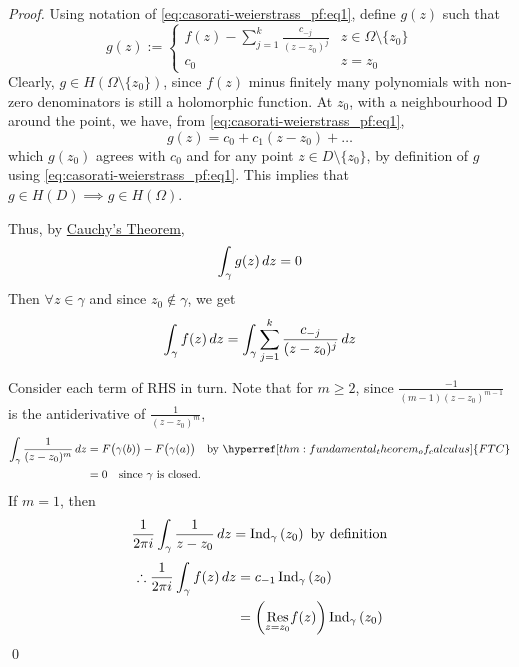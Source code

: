 \documentclass[notoc,notitlepage]{tufte-book}
\begin{document}
\begin{proof}
  Using notation of \cref{eq:casorati-weierstrass_pf:eq1}, define $g(z)$ such that
  \begin{equation*}
    g(z) := \begin{cases}
      f(z) - \sum_{j = 1}^{k} \frac{c_{-j}}{(z - z_0)^j}  & z \in \Omega \setminus \{z_0\} \\
      c_0                                                 & z = z_0
    \end{cases}
  \end{equation*}
  Clearly, $g \in H(\Omega \setminus \{z_0\})$, since $f(z)$ minus finitely many polynomials with non-zero denominators is still a holomorphic function. At $z_0$, with a neighbourhood D around the point, we have, from \cref{eq:casorati-weierstrass_pf:eq1},
  \begin{equation*}
    g(z) = c_0 + c_1 (z - z_0) + \hdots
  \end{equation*}
  which $g(z_0)$ agrees with $c_0$ and for any point $z \in D \setminus \{z_0\}$, by definition of $g$ using \cref{eq:casorati-weierstrass_pf:eq1}. This implies that $g \in H(D) \implies g \in H(\Omega)$.

  Thus, by \hyperref[thm:cauchy_s_theorem_for_convex_set]{Cauchy's Theorem},
  \begin{equation*}
    \int_{\gamma} g(z) \dif{z} = 0
  \end{equation*}
  Then $\forall z \in \gamma$ and since $z_0 \not\in \gamma$, we get
  \begin{equation*}
    \int_{\gamma} f(z) \dif{z} = \int_{\gamma} \sum_{j = 1}^k \frac{c_{-j}}{(z - z_0)^j} \dif{z}
  \end{equation*}

  Consider each term of RHS in turn. Note that for $m \geq 2$, since $\frac{-1}{(m - 1)(z - z_0)^{m - 1}}$ is the antiderivative of $\frac{1}{(z - z_0)^m}$,
  \begin{align*}
    \int_{\gamma} \frac{1}{(z - z_0)^m} \dif{z}
      &= F\big( \gamma(b) \big) - F\big( \gamma(a) \big) \quad \text{by } \hyperref[thm:fundamental_theorem_of_calculus]{FTC} \\
      &= 0 \quad \text{since } \gamma \text{ is closed.}
  \end{align*}
  If $m = 1$, then
  \begin{equation*}
    \frac{1}{2 \pi i} \int_{\gamma} \frac{1}{z - z_0} \dif{z} = \ind{z_0}{\gamma} \text{ by definition}
  \end{equation*}
  \begin{align*}
    \therefore \frac{1}{2 \pi i} \int_{\gamma} f(z) \dif{z}
      &= c_{-1} \ind{z_0}{\gamma} \\
      &= \left( \res{f(z)}{z = z_0} \right) \ind{z_0}{\gamma}
  \end{align*}\qed
\end{proof}
\end{document}
